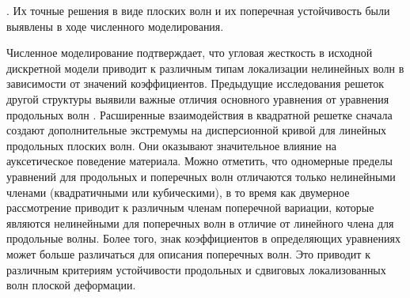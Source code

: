 
. Их точные решения в виде плоских волн и их поперечная устойчивость были выявлены в ходе численного моделирования.

Численное моделирование подтверждает, что угловая жесткость в исходной дискретной модели приводит к различным типам локализации нелинейных волн в зависимости от значений коэффициентов. Предыдущие исследования решеток другой структуры выявили важные отличия основного уравнения от уравнения продольных волн \cite {porkros}.
Расширенные взаимодействия в квадратной решетке сначала создают дополнительные экстремумы на дисперсионной кривой для линейных продольных плоских волн. Они оказывают значительное влияние на ауксетическое поведение материала. Можно отметить, что одномерные пределы уравнений для продольных и поперечных волн отличаются только нелинейными членами (квадратичными или кубическими), в то время как двумерное рассмотрение приводит к различным членам поперечной вариации, которые являются нелинейными для поперечных волн в отличие от линейного члена для продольные волны. Более того, знак коэффициентов в определяющих уравнениях может больше различаться для описания поперечных волн. Это приводит к различным критериям устойчивости продольных и сдвиговых локализованных волн плоской деформации.

